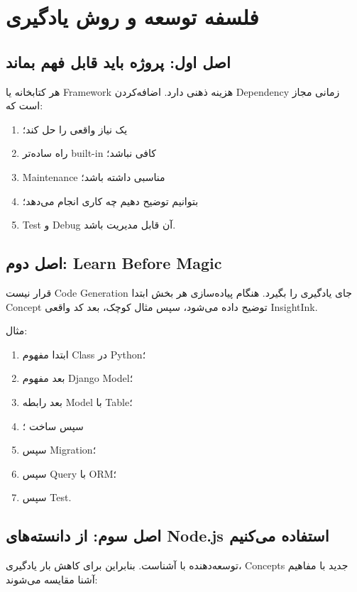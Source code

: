 
\chapter{فلسفه توسعه و روش یادگیری}

\section{اصل اول: پروژه باید قابل فهم بماند}

هر کتابخانه یا Framework هزینه ذهنی دارد. اضافه‌کردن Dependency زمانی مجاز است که:
\begin{enumerate}
  \item یک نیاز واقعی را حل کند؛
  \item راه ساده‌تر built-in کافی نباشد؛
  \item Maintenance مناسبی داشته باشد؛
  \item بتوانیم توضیح دهیم چه کاری انجام می‌دهد؛
  \item Test و Debug آن قابل مدیریت باشد.
\end{enumerate}

\section{اصل دوم: Learn Before Magic}

\begin{learningbox}
قرار نیست Code Generation جای یادگیری را بگیرد. هنگام پیاده‌سازی هر بخش ابتدا Concept توضیح داده می‌شود، سپس مثال کوچک، بعد کد واقعی InsightInk.
\end{learningbox}

مثال:
\begin{enumerate}
  \item ابتدا مفهوم Class در Python؛
  \item بعد مفهوم Django Model؛
  \item بعد رابطه Model با Table؛
  \item سپس ساخت ؛
  \item سپس Migration؛
  \item سپس Query با ORM؛
  \item سپس Test.
\end{enumerate}

\section{اصل سوم: از دانسته‌های Node.js استفاده می‌کنیم}

توسعه‌دهنده با  آشناست. بنابراین برای کاهش بار یادگیری، Concepts جدید با مفاهیم آشنا مقایسه می‌شوند:

